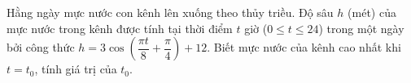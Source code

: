 \begin{ex}%
	Hằng ngày mực nước con kênh lên xuống theo thủy triều. Độ sâu $ h$ (mét) của mực nước trong kênh được tính tại thời điểm $t$ giờ ($0\le t\le24$) trong một ngày bởi công thức $ h=3\cos\left(\dfrac{\pi t}{8}+\dfrac{\pi}{4}\right)+12$. Biết mực nước của kênh cao nhất khi $t=t_0$, tính giá trị của $t_0$.
\end{ex}
